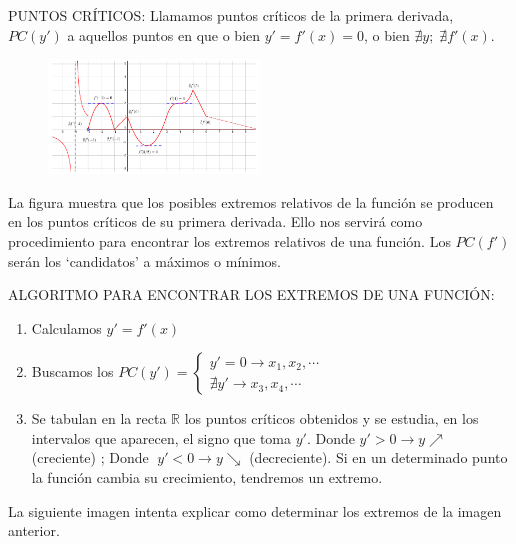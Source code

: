 	
	\begin{defi} PUNTOS CRÍTICOS:  Llamamos puntos críticos de la primera derivada, $PC(y')$ a aquellos puntos en que o bien $y'=f'(x)=0$, o bien $\nexists y; \; \nexists f'(x)$.
	\end{defi}
	
	\begin{multicols}{2}
	 
	\begin{figure}[H]
		\centering
		\includegraphics[width=0.5\textwidth]{imagenes/imagenes05/T05IM06.png}
	\end{figure}
	
	La figura muestra que los posibles extremos relativos de la función se producen en los puntos críticos de su primera derivada. Ello nos servirá como procedimiento para encontrar los extremos relativos de una función. Los $PC(f')$ serán los `candidatos' a máximos o mínimos.
	
	\end{multicols}
	
	ALGORITMO PARA ENCONTRAR LOS EXTREMOS DE UNA FUNCIÓN:	
	
	\begin{enumerate}
		\item Calculamos $y'=f'(x)$
		\item Buscamos los $PC(y')=\begin{cases}
							y'=0 \to x_1, x_2, \cdots \\
							\nexists y' \to x_3, x_4, \cdots	
							\end{cases}$
		\item Se tabulan en la recta $\mathbb R$ los puntos críticos obtenidos y se estudia, en los intervalos que aparecen, el signo que toma $y'$. Donde $y'>0 \to y \nearrow $ (creciente) ;  Donde $\;  y'<0 \to y \searrow $ (decreciente). Si en un determinado punto la función cambia su crecimiento, tendremos un extremo.
	\end{enumerate}
	
	La siguiente imagen intenta explicar como determinar los extremos de la imagen anterior.
	
